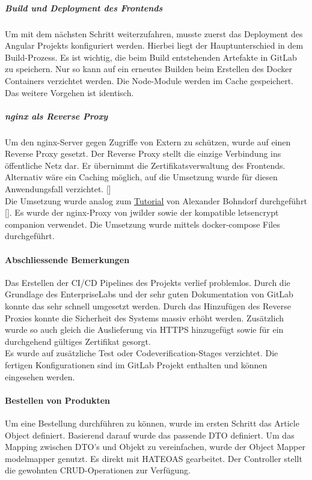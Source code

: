 \subparagraph{Build und Deployment des Frontends}
Um mit dem nächsten Schritt weiterzufahren, musste zuerst das Deployment des Angular Projekts konfiguriert werden. Hierbei liegt der Hauptunterschied in dem Build-Prozess. Es ist  wichtig, die beim Build entstehenden Artefakte in GitLab zu speichern. Nur so kann auf ein erneutes Builden beim Erstellen des Docker Containers verzichtet werden. Die Node-Module werden im Cache gespeichert. Das weitere Vorgehen ist identisch. 

\subparagraph{nginx als Reverse Proxy}\label{reverseProxy}
Um den nginx-Server gegen Zugriffe von Extern zu schützen, wurde auf einen Reverse Proxy gesetzt. Der Reverse Proxy stellt die einzige Verbindung ins öffentliche Netz dar. Er übernimmt die Zertifikatsverwaltung des Frontends. Alternativ wäre ein Caching möglich, auf die Umsetzung wurde für diesen Anwendungsfall verzichtet. [\cite{reverseProxy}] \\
Die Umsetzung wurde analog zum \href{https://sitegeist.de/blog/typo3-blog/docker-compose-setup-mit-nginx-reverse-proxy.html}{Tutorial} von Alexander Bohndorf durchgeführt [\cite{confReverseProxy}]. Es wurde der \gls{nginx}-Proxy von jwilder sowie der kompatible letsencrypt companion verwendet. Die Umsetzung wurde mittels docker-compose Files durchgeführt. 

\paragraph{Abschliessende Bemerkungen}
Das Erstellen der CI/CD Pipelines des Projekts verlief problemlos. Durch die Grundlage des \gls{EnterpriseLab}s und der sehr guten Dokumentation von \gls{GitLab} konnte das sehr schnell umgesetzt werden. Durch das Hinzufügen des Reverse Proxies konnte die Sicherheit des Systems massiv erhöht werden. Zusätzlich wurde so auch gleich die Auslieferung via HTTPS hinzugefügt sowie für ein durchgehend gültiges Zertifikat gesorgt. \\
Es wurde auf zusätzliche Test oder Codeverification-Stages verzichtet. 
Die fertigen Konfigurationen sind im \gls{GitLab} Projekt enthalten und können eingesehen werden. 

\paragraph{Bestellen von Produkten}\label{order}
Um eine Bestellung durchführen zu können, wurde im ersten Schritt das Article Object definiert. Basierend darauf wurde das passende \ac{DTO} definiert. Um das Mapping zwischen \ac{DTO}'s und Objekt zu vereinfachen, wurde der Object Mapper modelmapper genutzt. 
Es direkt mit \ac{HATEOAS} gearbeitet. Der Controller stellt die gewohnten \ac{CRUD}-Operationen zur Verfügung. 

